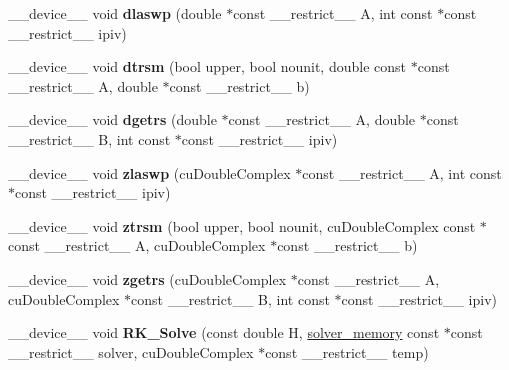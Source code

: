 \begin{DoxyCompactItemize}
\item 
\+\_\+\+\_\+device\+\_\+\+\_\+ void {\bfseries dlaswp} (double $\ast$const \+\_\+\+\_\+restrict\+\_\+\+\_\+ A, int const $\ast$const \+\_\+\+\_\+restrict\+\_\+\+\_\+ ipiv)\hypertarget{radau2a_8cu_ac3aa5304e0dad88bd10863e13c287fd5}{}\label{radau2a_8cu_ac3aa5304e0dad88bd10863e13c287fd5}

\item 
\+\_\+\+\_\+device\+\_\+\+\_\+ void {\bfseries dtrsm} (bool upper, bool nounit, double const $\ast$const \+\_\+\+\_\+restrict\+\_\+\+\_\+ A, double $\ast$const \+\_\+\+\_\+restrict\+\_\+\+\_\+ b)\hypertarget{radau2a_8cu_a8e4331dca6e7adb9838a7cd283f5d8f5}{}\label{radau2a_8cu_a8e4331dca6e7adb9838a7cd283f5d8f5}

\item 
\+\_\+\+\_\+device\+\_\+\+\_\+ void {\bfseries dgetrs} (double $\ast$const \+\_\+\+\_\+restrict\+\_\+\+\_\+ A, double $\ast$const \+\_\+\+\_\+restrict\+\_\+\+\_\+ B, int const $\ast$const \+\_\+\+\_\+restrict\+\_\+\+\_\+ ipiv)\hypertarget{radau2a_8cu_af739b5c0f82fc708026babff87a2853b}{}\label{radau2a_8cu_af739b5c0f82fc708026babff87a2853b}

\item 
\+\_\+\+\_\+device\+\_\+\+\_\+ void {\bfseries zlaswp} (cu\+Double\+Complex $\ast$const \+\_\+\+\_\+restrict\+\_\+\+\_\+ A, int const $\ast$const \+\_\+\+\_\+restrict\+\_\+\+\_\+ ipiv)\hypertarget{radau2a_8cu_a6b91937bd4502e4508486bdcf23a8291}{}\label{radau2a_8cu_a6b91937bd4502e4508486bdcf23a8291}

\item 
\+\_\+\+\_\+device\+\_\+\+\_\+ void {\bfseries ztrsm} (bool upper, bool nounit, cu\+Double\+Complex const $\ast$const \+\_\+\+\_\+restrict\+\_\+\+\_\+ A, cu\+Double\+Complex $\ast$const \+\_\+\+\_\+restrict\+\_\+\+\_\+ b)\hypertarget{radau2a_8cu_a6dc4374e351f792988fe9a880b9262eb}{}\label{radau2a_8cu_a6dc4374e351f792988fe9a880b9262eb}

\item 
\+\_\+\+\_\+device\+\_\+\+\_\+ void {\bfseries zgetrs} (cu\+Double\+Complex $\ast$const \+\_\+\+\_\+restrict\+\_\+\+\_\+ A, cu\+Double\+Complex $\ast$const \+\_\+\+\_\+restrict\+\_\+\+\_\+ B, int const $\ast$const \+\_\+\+\_\+restrict\+\_\+\+\_\+ ipiv)\hypertarget{radau2a_8cu_a78d590ae02cdd238f47f5f3060235d90}{}\label{radau2a_8cu_a78d590ae02cdd238f47f5f3060235d90}

\item 
\+\_\+\+\_\+device\+\_\+\+\_\+ void {\bfseries R\+K\+\_\+\+Solve} (const double H, \hyperlink{structsolver__memory}{solver\+\_\+memory} const $\ast$const \+\_\+\+\_\+restrict\+\_\+\+\_\+ solver, cu\+Double\+Complex $\ast$const \+\_\+\+\_\+restrict\+\_\+\+\_\+ temp)\hypertarget{radau2a_8cu_a8a29dabf1d9ad69f2707d575ffc9f9d3}{}\label{radau2a_8cu_a8a29dabf1d9ad69f2707d575ffc9f9d3}


\end{DoxyCompactItemize}
